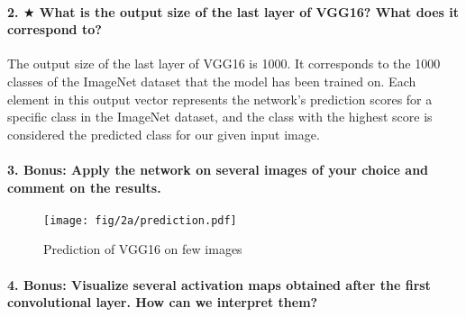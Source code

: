 







\paragraph{2. $\bigstar$ What is the output size of the last layer of VGG16? What does it correspond to?}
The output size of the last layer of VGG16 is 1000. It corresponds to the 1000 classes of the ImageNet dataset that the model has been trained on. Each element in this output vector represents  the network's prediction scores for a specific class in the ImageNet dataset, and the class with the highest score is considered the predicted class for our given input image.

\paragraph{3. \textbf{Bonus}: Apply the network on several images of your choice and comment on the results.}
\begin{figure}[H]
    \centering
    \texttt{[image: fig/2a/prediction.pdf]}
    \caption{Prediction of VGG16 on few images}
\end{figure}

\paragraph{4. \textbf{Bonus}: Visualize several activation maps obtained after the first convolutional layer. How can we interpret them?}

